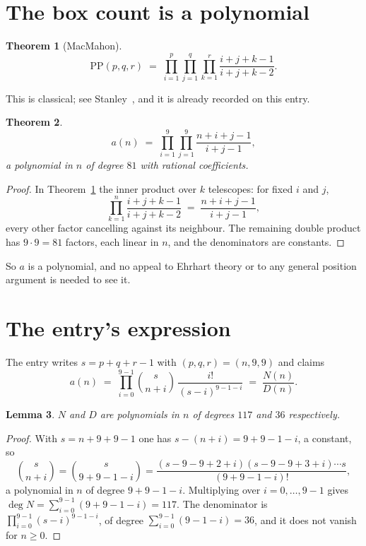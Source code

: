 \documentclass[11pt,a4paper]{article}
\theoremstyle{plain}
\newtheorem{theorem}{Theorem}
\newtheorem{lemma}[theorem]{Lemma}
\theoremstyle{definition}
\begin{document}
\section{The box count is a polynomial}

\begin{theorem}[MacMahon]\label{thm:mm}
\[
\mathrm{PP}(p,q,r)\;=\;\prod_{i=1}^{p}\prod_{j=1}^{q}\prod_{k=1}^{r}
\frac{i+j+k-1}{i+j+k-2} .
\]
\end{theorem}

This is classical; see Stanley~\cite{stanley}, and it is already recorded on this entry.

\begin{theorem}\label{thm:poly}
\[
a(n)\;=\;\prod_{i=1}^{9}\prod_{j=1}^{9}\frac{n+i+j-1}{i+j-1},
\]
a polynomial in $n$ of degree $81$ with rational coefficients.
\end{theorem}

\begin{proof}
In Theorem~\ref{thm:mm} the inner product over $k$ telescopes: for fixed $i$ and $j$,
\[
\prod_{k=1}^{n}\frac{i+j+k-1}{i+j+k-2}\;=\;\frac{n+i+j-1}{i+j-1} ,
\]
every other factor cancelling against its neighbour. The remaining double product has
$9\cdot9=81$ factors, each linear in $n$, and the denominators are constants.
\end{proof}

So $a$ is a polynomial, and no appeal to Ehrhart theory or to any general position argument is
needed to see it.

\section{The entry's expression}

The entry writes $s=p+q+r-1$ with $(p,q,r)=(n,9,9)$ and claims
\[
a(n)\;=\;\prod_{i=0}^{9-1}\binom{s}{n+i}\,\frac{i!}{(s-i)^{9-1-i}}\;=\;
\frac{N(n)}{D(n)} .
\]

\begin{lemma}\label{lem:deg}
$N$ and $D$ are polynomials in $n$ of degrees $117$ and $36$ respectively.
\end{lemma}

\begin{proof}
With $s=n+9+9-1$ one has $s-(n+i)=9+9-1-i$, a constant, so
\[
\binom{s}{n+i}=\binom{s}{9+9-1-i}
=\frac{(s-9-9+2+i)(s-9-9+3+i)\cdots s}{(9+9-1-i)!},
\]
a polynomial in $n$ of degree $9+9-1-i$. Multiplying over $i=0,\dots,9-1$ gives
$\deg N=\sum_{i=0}^{9-1}(9+9-1-i)=117$. The denominator is
$\prod_{i=0}^{9-1}(s-i)^{9-1-i}$, of degree
$\sum_{i=0}^{9-1}(9-1-i)=36$, and it does not vanish for $n\ge0$.
\end{proof}
\end{document}
